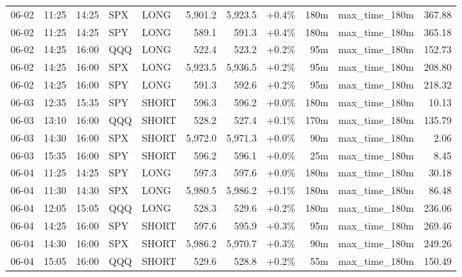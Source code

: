 \documentclass[11pt,a4paper,twoside]{article}
\begin{document}
\begin{center}
\begin{longtable}{>{\color{txtmain}}l l l l l r r r r >{\color{txtmain}}l r}
06-02 & 11:25 & 14:25 & SPX & LONG & 5,901.2 & 5,923.5 & \textcolor{wingreen}{+0.4\%} & 180m & max\_time\_180m & \textcolor{wingreen}{367.88} \\
06-02 & 11:25 & 14:25 & SPY & LONG & 589.1 & 591.3 & \textcolor{wingreen}{+0.4\%} & 180m & max\_time\_180m & \textcolor{wingreen}{365.18} \\
06-02 & 14:25 & 16:00 & QQQ & LONG & 522.4 & 523.2 & \textcolor{wingreen}{+0.2\%} & 95m & max\_time\_180m & \textcolor{wingreen}{152.73} \\
06-02 & 14:25 & 16:00 & SPX & LONG & 5,923.5 & 5,936.5 & \textcolor{wingreen}{+0.2\%} & 95m & max\_time\_180m & \textcolor{wingreen}{208.80} \\
06-02 & 14:25 & 16:00 & SPY & LONG & 591.3 & 592.6 & \textcolor{wingreen}{+0.2\%} & 95m & max\_time\_180m & \textcolor{wingreen}{218.32} \\
06-03 & 12:35 & 15:35 & SPY & SHORT & 596.3 & 596.2 & \textcolor{wingreen}{+0.0\%} & 180m & max\_time\_180m & \textcolor{wingreen}{10.13} \\
06-03 & 13:10 & 16:00 & QQQ & SHORT & 528.2 & 527.4 & \textcolor{wingreen}{+0.1\%} & 170m & max\_time\_180m & \textcolor{wingreen}{135.79} \\
06-03 & 14:30 & 16:00 & SPX & SHORT & 5,972.0 & 5,971.3 & \textcolor{wingreen}{+0.0\%} & 90m & max\_time\_180m & \textcolor{wingreen}{2.06} \\
06-03 & 15:35 & 16:00 & SPY & SHORT & 596.2 & 596.1 & \textcolor{wingreen}{+0.0\%} & 25m & max\_time\_180m & \textcolor{wingreen}{8.45} \\
06-04 & 11:25 & 14:25 & SPY & LONG & 597.3 & 597.6 & \textcolor{wingreen}{+0.0\%} & 180m & max\_time\_180m & \textcolor{wingreen}{30.18} \\
06-04 & 11:30 & 14:30 & SPX & LONG & 5,980.5 & 5,986.2 & \textcolor{wingreen}{+0.1\%} & 180m & max\_time\_180m & \textcolor{wingreen}{86.48} \\
06-04 & 12:05 & 15:05 & QQQ & LONG & 528.3 & 529.6 & \textcolor{wingreen}{+0.2\%} & 180m & max\_time\_180m & \textcolor{wingreen}{236.06} \\
06-04 & 14:25 & 16:00 & SPY & SHORT & 597.6 & 595.9 & \textcolor{wingreen}{+0.3\%} & 95m & max\_time\_180m & \textcolor{wingreen}{269.46} \\
06-04 & 14:30 & 16:00 & SPX & SHORT & 5,986.2 & 5,970.7 & \textcolor{wingreen}{+0.3\%} & 90m & max\_time\_180m & \textcolor{wingreen}{249.26} \\
06-04 & 15:05 & 16:00 & QQQ & SHORT & 529.6 & 528.8 & \textcolor{wingreen}{+0.2\%} & 55m & max\_time\_180m & \textcolor{wingreen}{150.49} \\

\end{longtable}
\end{center}
\end{document}
